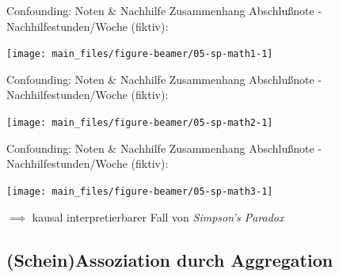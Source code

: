 \documentclass[
  10pt,
  ignorenonframetext,
]{beamer}
\begin{document}
\begin{frame}{Confounding: Noten \& Nachhilfe}
\label{confounding-noten-nachhilfe}
Zusammenhang Abschlußnote - Nachhilfestunden/Woche (fiktiv):

\scriptsize\normalsize

\scriptsize

\begin{center}\texttt{[image: main\_files/figure-beamer/05-sp-math1-1]} \end{center}

\normalsize
\end{frame}

\begin{frame}{Confounding: Noten \& Nachhilfe}
\label{confounding-noten-nachhilfe-1}
Zusammenhang Abschlußnote - Nachhilfestunden/Woche (fiktiv):

\scriptsize

\begin{center}\texttt{[image: main\_files/figure-beamer/05-sp-math2-1]} \end{center}

\normalsize
\end{frame}

\begin{frame}{Confounding: Noten \& Nachhilfe}
\label{confounding-noten-nachhilfe-2}
Zusammenhang Abschlußnote - Nachhilfestunden/Woche (fiktiv):

\scriptsize

\begin{center}\texttt{[image: main\_files/figure-beamer/05-sp-math3-1]} \end{center}

\normalsize

\(\implies\) kausal interpretierbarer Fall von \emph{Simpson's Paradox}
\end{frame}

\subsection{(Schein)Assoziation durch
Aggregation}\label{scheinassoziation-durch-aggregation}
\end{document}
